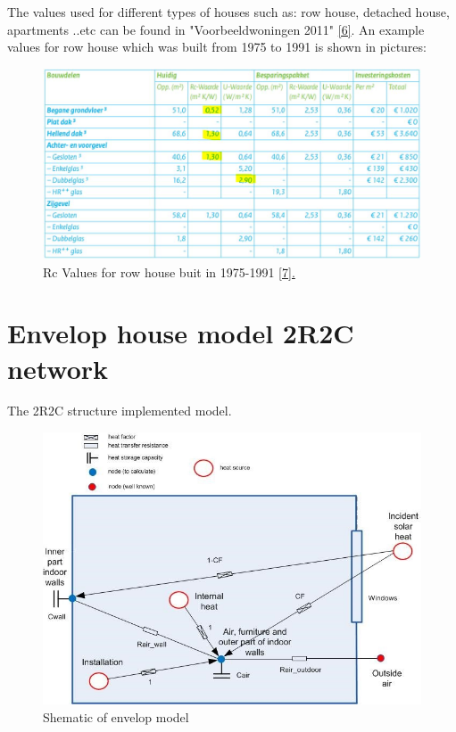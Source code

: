 \documentclass[a4paper,10pt]{article}
\begin{document}
The values used for different types of houses such as: row house, detached house, apartments ..etc can be found in "Voorbeeldwoningen 2011" \href{https://www.rvo.nl/onderwerpen/duurzaam-ondernemen/gebouwen/woningbouw/particuliere-woningen/voorbeeldwoningen}{[6]}. An example values for row house which was built from 1975 to 1991 is shown in pictures:


	
\begin{figure}[H]
	\centering
	\includegraphics[width=0.8\columnwidth]{Pictures/row_house_1975-1991.JPG}
	\caption[Short title]{Rc Values for row house buit in 1975-1991 \href{Voorbeeldwoningen 2011 bestaande bouw.pdf}{[7].}}
	\label{row house}
	\end{figure} 
\newpage	
\section{Envelop house model 2R2C network}

The 2R2C structure implemented model.
	
\begin{figure}[H]
	\centering
	\includegraphics[width=1.0\columnwidth]{Pictures/envelopRC.jpg}
	\caption[Short title]{Shematic of envelop model}
	\label{row house}
	\end{figure} 
	
\end{document}
